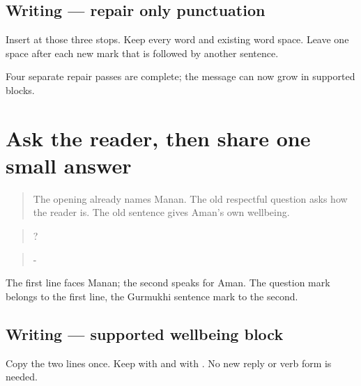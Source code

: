 \subsection*{Writing — repair only punctuation}
Insert \textbf{} at those three stops. Keep every word and existing word space. Leave one space after each new mark that is followed by another sentence.

\begin{tcolorbox}[breakable,colback=teal!4,colframe=teal!35!black,title={Before you move on}]
Four separate repair passes are complete; the message can now grow in supported blocks.
\end{tcolorbox}
\section[\texorpdfstring{\pa{ਤੁਸੀਂ} \pa{ਕਿਵੇਂ} \pa{ਹੋ}? · \pa{ਮੈਂ} … (tusī̃ kivē̃ hō …)}{ਤੁਸੀਂ ਕਿਵੇਂ ਹੋ? · ਮੈਂ … (tusī̃ kivē̃ hō …)}]{Ask the reader, then share one small answer}

\label{lesson:PA-W12-wellbeing-supported}



\begin{quote}
The opening already names Manan. The old respectful question asks how the reader is. The old \textbf{} sentence gives Aman's own wellbeing.
\end{quote}

\begin{tcolorbox}[breakable,skin=enhanced,colback=orange!6,colframe=orange!45!black,boxrule=0.5pt,arc=1mm,left=6pt,right=6pt,top=4pt,bottom=4pt,fonttitle=\bfseries,title={Read this}]
\begin{quote}
  ?
\end{quote}

\begin{quote}
 - 
\end{quote}

The first line faces Manan; the second speaks for Aman. The question mark belongs to the first line, the Gurmukhi sentence mark to the second.
\end{tcolorbox}

\subsection*{Writing — supported wellbeing block}
Copy the two lines once. Keep \textbf{} with \textbf{} and \textbf{} with \textbf{}. No new reply or verb form is needed.

